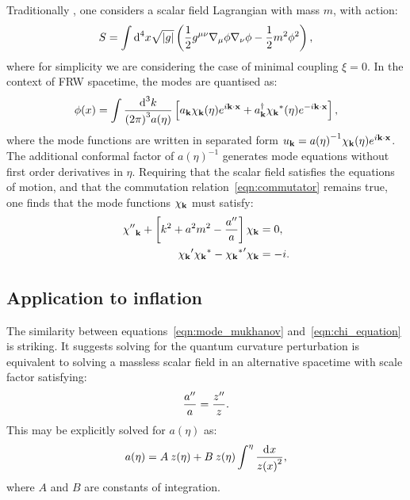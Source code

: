 Traditionally \citep{Birrell+1984,Parker+2009}, one considers a scalar field Lagrangian with mass \(m\), with action:
\begin{equation}
  S = \int \d[4]{x} \sqrt{|g|}\left( \frac{1}{2}g^{\mu\nu}\nabla_\mu\phi\nabla_\nu\phi - \frac{1}{2}m^2\phi^2 \right),
  \label{eqn:scalar_field}
\end{equation}
where for simplicity we are considering the case of minimal coupling \(\xi=0\).  
In the context of FRW spacetime, the modes are quantised as:
\begin{equation}
  \phi(x) = \int\frac{\d[3]{k}}{{(2\pi)}^3a(\eta)} \left[ a_\vk \chi_\vk(\eta)e^{i\vk\cdot\vx} + a_{\vk}^{\dagger} \str{\chi_\vk}(\eta)e^{-i\vk\cdot\vx} \right],
  \label{eqn:mode_expansion}
\end{equation}
where the mode functions are written in separated form \(u_{\mathbf{k}} = a{(\eta)}^{-1}\chi_{\mathbf{k}}(\eta)e^{i \mathbf{k}\cdot\mathbf{x}}\). The additional conformal factor of \({a(\eta)}^{-1}\) generates mode equations without first order derivatives in \(\eta\).
Requiring that the scalar field satisfies the equations of motion, and that the commutation relation~\eqref{eqn:commutator} remains true,
one finds that the mode functions \(\chi_{\mathbf{k}}\) must satisfy:
\begin{align}
  \dprm{\chi}_\vk + \left[ k^2 + a^2 m^2 - \frac{\dprm{a}}{a}  \right] \chi_\vk &= 0,
  \label{eqn:chi_equation}\\
  \prm{\chi_\vk} \str{\chi_\vk} - \prm{\str{\chi_\vk}} \chi_\vk &= -i.
  \label{eqn:normalisation_1}
\end{align}

\subsection{Application to inflation}
\label{sec:bridge}
The similarity between equations~\eqref{eqn:mode_mukhanov} and~\eqref{eqn:chi_equation} is striking. It suggests solving for the quantum curvature perturbation is equivalent to solving a massless scalar field in an alternative spacetime with scale factor satisfying:
\begin{equation}
  \frac{\dprm{a}}{a} = \frac{\dprm{z}}{z}.
  \label{eqn:mapping}
\end{equation}
This may be explicitly solved for \(a(\eta)\) as:
\begin{equation}
  a(\eta) = A\:z(\eta) + B\:z(\eta) \int^\eta \frac{\d{x}}{{z(x)}^2},
  \label{eqn:a_sol}
\end{equation}
where \(A\) and \(B\) are constants of integration. 


